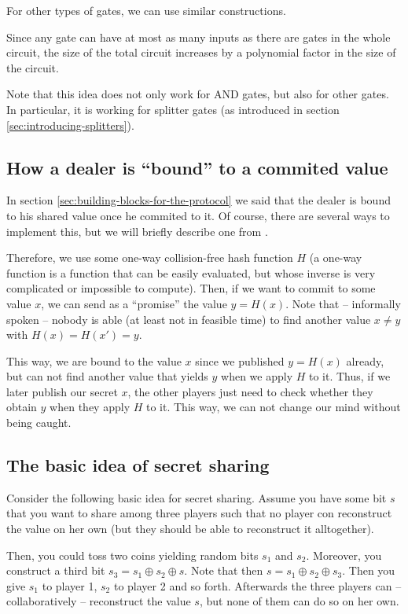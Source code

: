 \message{ !name(seminar.tex)}\documentclass{llncs}
\begin{document}
For other types of gates, we can use similar constructions.

Since any gate can have at most as many inputs as there are gates in the whole circuit, the size of the total circuit increases by a polynomial factor in the size of the circuit.

Note that this idea does not only work for AND gates, but also for other gates. In particular, it is working for splitter gates (as introduced in section \ref{sec:introducing-splitters}).

\subsection{How a dealer is ``bound'' to a commited value}
\label{sec:dealer-bound-to-commited-value}

In section \ref{sec:building-blocks-for-the-protocol} we said that the dealer is bound to his shared value once he commited to it. Of course, there are several ways to implement this, but we will briefly describe one from \cite{lecture-notes-goldwasser-bellare}.

Therefore, we use some one-way collision-free hash function $H$ (a one-way function is a function that can be easily evaluated, but whose inverse is very complicated or impossible to compute). Then, if we want to commit to some value $x$, we can send as a ``promise'' the value $y=H(x)$. Note that -- informally spoken -- nobody is able (at least not in feasible time) to find another value $x\neq y$ with $H(x)=H(x')=y$.

This way, we are bound to the value $x$ since we published $y=H(x)$ already, but can not find another value that yields $y$ when we apply $H$ to it. Thus, if we later publish our secret $x$, the other players just need to check whether they obtain $y$ when they apply $H$ to it. This way, we can not change our mind without being caught.

\subsection{The basic idea of secret sharing}
\label{sec:appendix-basic-idea-secret-sharing}

Consider the following basic idea for secret sharing. Assume you have some bit $s$ that you want to share among three players such that no player con reconstruct the value on her own (but they should be able to reconstruct it alltogether). 

Then, you could toss two coins yielding random bits $s_1$ and $s_2$. Moreover, you construct a third bit $s_3=s_1\oplus s_2\oplus s$. Note that then $s=s_1\oplus s_2 \oplus s_3$. Then you give $s_1$ to player 1, $s_2$ to player 2 and so forth. Afterwards the three players can -- collaboratively -- reconstruct the value $s$, but none of them can do so on her own.
\end{document}
